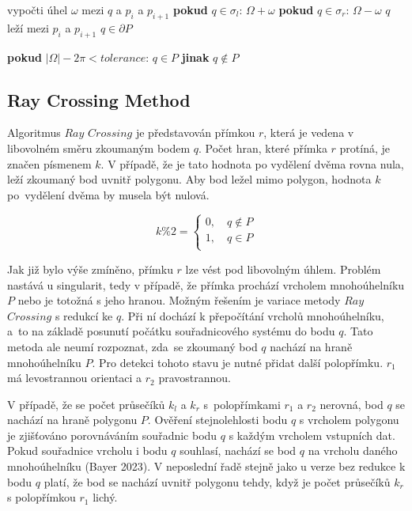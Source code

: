 \documentclass[15pt]{article}
\begin{document}
\begin{spacing}{1.5}
\begin{algorithm}
\begin{algorithmic}[1]
        \State \indent vypočti úhel $\omega$ mezi $q$ a $p_i$ a $p_{i+1}$
        \State \indent \textbf{pokud} $q \in \sigma_l$:
        \State \indent  \indent $\varOmega + \omega$
        \State \indent \textbf{pokud} $q \in \sigma_r$:
        \State \indent \indent $\varOmega - \omega$
        \State {} $q$ leží mezi $p_i$ a $p_{i+1}$
        \State \indent \indent $q \in \partial P$
        
        \State \textbf{pokud} $|\varOmega| - 2\pi < tolerance$:
        \State \indent $q \in P$
        \State \textbf{jinak} $q \notin P$
    \end{algorithmic}
\end{algorithm}

\subsection*{Ray Crossing Method}
Algoritmus $Ray$ $Crossing$ je představován přímkou $r$, která je vedena v libovolném směru zkoumaným bodem $q$. Počet hran, které přímka $r$ protíná, je značen písmenem $k$. V případě, že je tato hodnota po vydělení dvěma rovna nula, leží zkoumaný bod uvnitř polygonu. Aby bod ležel mimo polygon, hodnota $k$ po vydělení dvěma by musela být nulová. 

\begin{equation*}
k\%2=\begin{cases}
    0, \quad q  \notin P\\
    1, \quad q  \in P\\
\end{cases}
\end{equation*}

Jak již bylo výše zmíněno, přímku $r$ lze vést pod libovolným úhlem. Problém nastává u singularit, tedy v případě, že přímka prochází vrcholem mnohoúhelníku $P$ nebo je totožná s jeho hranou. Možným řešením je variace metody $Ray$ $Crossing$ s redukcí ke $q$. Při ní dochází k přepočítání vrcholů mnohoúhelníku, a to na základě posunutí počátku souřadnicového systému do bodu $q$. Tato metoda ale neumí rozpoznat, zda se zkoumaný bod $q$ nachází na hraně mnohoúhelníku $P$. Pro detekci tohoto stavu je nutné přidat další polopřímku. $r_1$ má levostrannou orientaci a $r_2$ pravostrannou. 

V případě, že se počet průsečíků $k_l$ a $k_r$ s polopřímkami $r_1$ a $r_2$ nerovná, bod $q$ se nachází na hraně polygonu $P$. Ověření stejnolehlosti bodu $q$ s vrcholem polygonu je zjišťováno porovnáváním souřadnic bodu $q$ s každým vrcholem vstupních dat. Pokud souřadnice vrcholu i bodu $q$ souhlasí, nachází se bod $q$ na vrcholu daného mnohoúhelníku (Bayer 2023). V neposlední řadě stejně jako u verze bez redukce k bodu $q$ platí, že bod se nachází uvnitř polygonu tehdy, když je počet průsečíků $k_r$ s polopřímkou $r_1$ lichý. 



\end{spacing}
\end{document}
